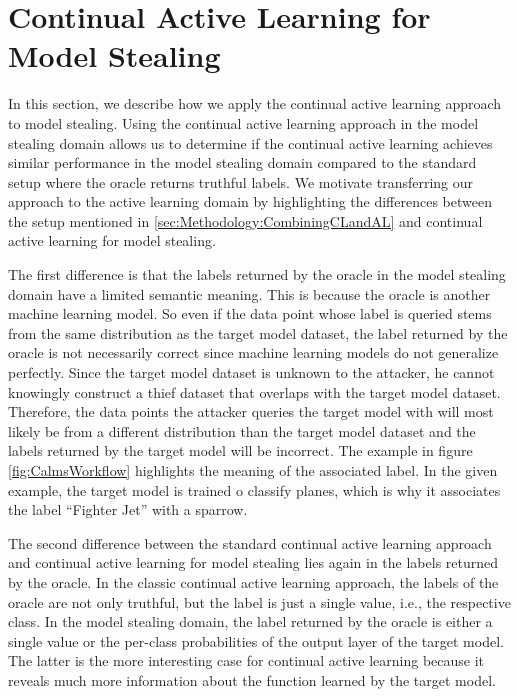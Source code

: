 \section{Continual Active Learning for Model Stealing}
\label{sec:Methodolody:CALMS}
In this section, we describe how we apply the continual active learning approach to model stealing. Using the continual active learning approach
in the model stealing domain allows us to determine if the continual active learning achieves similar performance in the model stealing domain compared to
the standard setup where the oracle returns truthful labels. We motivate transferring our approach to the active learning domain by highlighting the
 differences between the setup mentioned in \ref{sec:Methodology:CombiningCLandAL} and continual active learning for model stealing. \par
The first difference is that the labels returned by the oracle in the model stealing domain have a limited semantic meaning. This is because the oracle
 is another machine learning model. So even if the data point whose label is queried stems from the same distribution as the target model dataset,
the label returned by the oracle is not necessarily correct since machine learning models do not generalize perfectly. Since the target model dataset
is unknown to the attacker, he cannot knowingly construct a thief dataset that overlaps with the target model dataset. Therefore, the data points the
 attacker queries the target model with will most likely be from a different distribution than the target model dataset and the labels returned by the target model
will be incorrect. The example in figure \ref{fig:CalmsWorkflow} highlights the meaning of the associated label. In the given example, the target model 
is trained o classify planes, which is why it associates the label \enquote{Fighter Jet} with a sparrow. \par
The second difference between the standard continual active learning approach and continual active learning for model stealing lies again in the labels
returned by the oracle. In the classic continual active learning approach, the labels of the oracle are not only truthful, but the label is just a
single value, i.e., the respective class. In the model stealing domain, the label returned by the oracle is either a single value or the per-class
probabilities of the output layer of the target model. The latter is the more interesting case for continual active learning because it reveals much more
information about the function learned by the target model. \par
